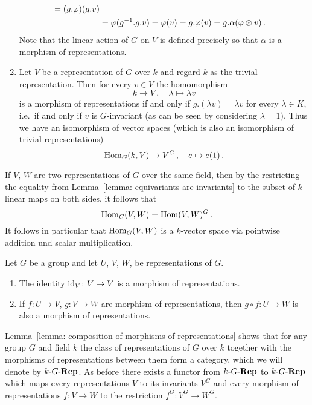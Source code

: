 \begin{example}
\begin{enumerate}
\begin{align*}
         =  (g.\varphi)(g.v)
        \\
        &=  \varphi(g^{-1}.g.v)
         =  \varphi(v)
         =  g.\varphi(v)
         =  g.\alpha(\varphi \mathbin{\otimes} v) \,.
      \end{align*}
      Note that the linear action of $G$ on $V$ is defined precisely so that $\alpha$ is a morphism of representations.
    \item
      Let $V$ be a representation of $G$ over $k$ and regard $k$ as the trivial representation.
      Then for every $v \in V$ the homomorphism
      \[
                k
        \to     V \,,
        \quad   \lambda
        \mapsto \lambda v
      \]
      is a morphism of representations if and only if $g.(\lambda v) = \lambda v$ for every $\lambda \in K$, i.e.\ if and only if $v$ is $G$-invariant (as can be seen by considering $\lambda = 1$).
      Thus we have an isomorphism of vector spaces (which is also an isomorphism of trivial representations)
      \[
                \operatorname{Hom}_G(k,V)
        \to     V^G \,,
        \quad   e
        \mapsto e(1) \,.
      \]
  \end{enumerate}
\end{example}


\begin{remark}
  If $V$, $W$ are two representations of $G$ over the same field, then by the restricting the equality from Lemma~\ref{lemma: equivariants are invariants} to the subset of $k$-linear maps on both sides, it follows that
  \[
      \operatorname{Hom}_G(V,W)
    = \operatorname{Hom}(V,W)^G \,.
  \]
  It follows in particular that $\operatorname{Hom}_G(V,W)$ is a $k$-vector space via pointwise addition und scalar multiplication.
\end{remark}


\begin{lemma}
\label{lemma: composition of morphisms of representations}
  Let $G$ be a group and let $U$, $V$, $W$, be representations of $G$.
  \begin{enumerate}
    \item
      The identity $\operatorname{id}_V \colon V \to V$ is a morphism of representations.
    \item
      If $f \colon U \to V$, $g \colon V \to W$ are morphism of representations, then $g \circ f \colon U \to W$ is also a morphism of representations.
  \end{enumerate}
\end{lemma}


\begin{fluff}
  Lemma~\ref{lemma: composition of morphisms of representations} shows that for any group $G$ and field $k$ the class of representations of $G$ over $k$ together with the morphisms of representations between them form a category, which we will denote by $k\text{-}G\text{-}\mathbf{Rep}$.
  As before there exists a functor from $k\text{-}G\text{-}\mathbf{Rep}$ to $k\text{-}G\text{-}\mathbf{Rep}$ which maps every representations $V$ to its invariants $V^G$ and every morphism of representations $f \colon V \to W$ to the restriction $f^G \colon V^G \to W^G$.
\end{fluff}


